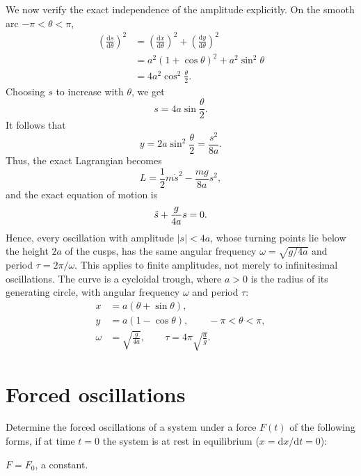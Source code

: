 \begin{problem}[title={Tautochrone: period independent of amplitude}]
{We now verify the exact independence of the amplitude explicitly. On the smooth arc $-\pi < \theta < \pi$,
\begin{align*}
    \left(\frac{\mathrm{d}s}{\mathrm{d}\theta}\right)^2 &= \left(\frac{\mathrm{d}x}{\mathrm{d}\theta}\right)^2 + \left(\frac{\mathrm{d}y}{\mathrm{d}\theta}\right)^2 \\
    &= a^2(1 + \cos{\theta})^2 + a^2\sin^2{\theta} \\
    &= 4a^2\cos^2{\frac{\theta}{2}}.
\end{align*}
Choosing $s$ to increase with $\theta$, we get
\begin{equation*}
    s = 4a\sin{\frac{\theta}{2}}.
\end{equation*}
It follows that
\begin{equation*}
    y = 2a\sin^2{\frac{\theta}{2}} = \frac{s^2}{8a}.
\end{equation*}
Thus, the exact Lagrangian becomes
\begin{equation*}
    L = \frac{1}{2}m\Dot{s}^2 - \frac{mg}{8a}s^2,
\end{equation*}
and the exact equation of motion is
\begin{equation*}
    \Ddot{s} + \frac{g}{4a}s = 0.
\end{equation*}
Hence, every oscillation with amplitude $|s| < 4a$, \ie whose turning points lie below the height $2a$ of the cusps, has the same angular frequency $\omega = \sqrt{g/4a}$ and period $\tau = 2\pi/\omega$. This applies to finite amplitudes, not merely to infinitesimal oscillations.
}
{
The curve is a cycloidal trough, where $a > 0$ is the radius of its generating circle, with angular frequency $\omega$ and period $\tau$:
\begin{align*}
    x &= a(\theta + \sin{\theta}), \\
    y &= a(1 - \cos{\theta}), \qquad -\pi < \theta < \pi, \\
    \omega &= \sqrt{\frac{g}{4a}}, \qquad \tau = 4\pi\sqrt{\frac{a}{g}}.
\end{align*}
}
\end{problem}

\section{Forced oscillations}


\begin{problem}[title={Forced oscillations under four forms of force}]
{
Determine the forced oscillations of a system under a force $F(t)$ of the following forms, if at time $t = 0$ the system is at rest in equilibrium ($x = \mathrm{d}x/\mathrm{d}t = 0$):
}{}{}
\end{problem}
\begin{subproblem}
{
$F = F_0$, a constant.
}
{}
{}
\end{subproblem}

